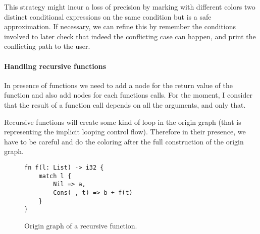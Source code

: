 \documentclass[a4paper,10pt]{article}
\begin{document}
This strategy might incur a loss of precision by marking with different colors two distinct conditional expressions on the same condition but is a safe approximation. If necessary, we can refine this by remember the conditions involved to later check that indeed the conflicting case can happen, and print the conflicting path to the user.
\FloatBarrier

\paragraph{Handling recursive functions} In presence of functions we need to add a node for the return value of the function and also add nodes for each functions calls. For the moment, I consider that the result of a function call depends on all the arguments, and only that.

Recursive functions will create some kind of loop in the origin graph (that is representing the implicit looping control flow). Therefore in their presence, we have to be careful and do the coloring after the full construction of the origin graph.
\begin{figure}[!ht]
\begin{minipage}{.5\textwidth}
\begin{lstlisting}
fn f(l: List) -> i32 {
    match l {
        Nil => a,
        Cons(_, t) => b + f(t)
    }
}
\end{lstlisting}
\end{minipage}\hfill
\begin{minipage}{.45\textwidth}
\centering{}
\end{minipage}
\caption{Origin graph of a recursive function.}
\label{fig:fun_rec}
\end{figure}
\end{document}
